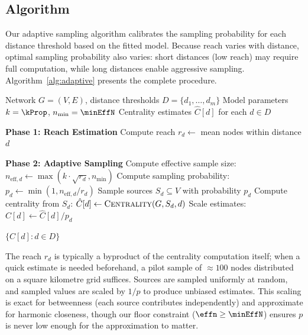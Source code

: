 
\subsection{Algorithm}

Our adaptive sampling algorithm calibrates the sampling probability for each distance threshold based on the fitted model. Because reach varies with distance, optimal sampling probability also varies: short distances (low reach) may require full computation, while long distances enable aggressive sampling. Algorithm~\ref{alg:adaptive} presents the complete procedure.

\begin{algorithm}[htbp]
\caption{Adaptive Per-Distance Sampling for Network Centrality}
\label{alg:adaptive}
\begin{algorithmic}[1]
\Require Network $G = (V, E)$, distance thresholds $D = \{d_1, \ldots, d_m\}$
\Require Model parameters $k = \kProp$, $n_{\min} = \minEffN$
\Ensure Centrality estimates $\hat{C}[d]$ for each $d \in D$

\State \textbf{Phase 1: Reach Estimation}
    \State Compute reach $r_d \gets$ mean nodes within distance $d$
\EndFor

\State \textbf{Phase 2: Adaptive Sampling}
    \State Compute effective sample size: $n_{\text{eff},d} \gets \max(k \cdot \sqrt{r_d}, n_{\min})$
    \State Compute sampling probability: $p_d \gets \min(1, n_{\text{eff},d} / r_d)$
    \State Sample sources $S_d \subseteq V$ with probability $p_d$
    \State Compute centrality from $S_d$: $\hat{C}[d] \gets \textsc{Centrality}(G, S_d, d)$
    \State Scale estimates: $\hat{C}[d] \gets \hat{C}[d] / p_d$
\EndFor

\State \Return $\{\hat{C}[d] : d \in D\}$
\end{algorithmic}
\end{algorithm}

The reach $r_d$ is typically a byproduct of the centrality computation itself; when a quick estimate is needed beforehand, a pilot sample of $\approx 100$ nodes distributed on a square kilometre grid suffices. Sources are sampled uniformly at random, and sampled values are scaled by $1/p$ to produce unbiased estimates. This scaling is exact for betweenness (each source contributes independently) and approximate for harmonic closeness, though our floor constraint ($\effn \geq \minEffN$) ensures $p$ is never low enough for the approximation to matter.

